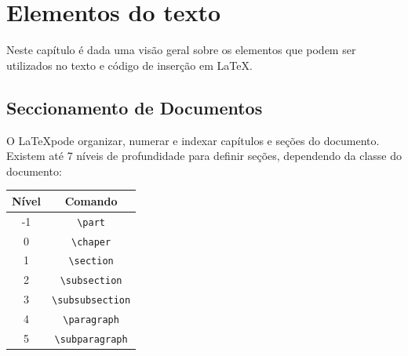 \chapter{Elementos do texto}
\label{cap:texto}

Neste capítulo é dada uma visão geral sobre os elementos que podem ser utilizados no texto e código de inserção em \LaTeX.

\section{Seccionamento de Documentos}
\label{sec:sec} 

O \LaTeX pode organizar, numerar e indexar capítulos e seções do documento. Existem até 7 níveis de profundidade para definir seções, dependendo da classe do documento:

\begin{quadro}[!ht]
\caption{Níveis de seccionamento de documentos em \LaTeX.}
\label{qua:niveis}
\begin{center}
\begin{tabular}{|c|c|}        
\hline
\textbf{Nível} & \textbf{Comando}\\ \hline\hline
-1 & \verb|\part| \\
\hline
0 & \verb|\chaper| \\
\hline
1 & \verb|\section| \\
\hline
2 & \verb|\subsection| \\
\hline
3 & \verb|\subsubsection| \\
\hline
4 & \verb|\paragraph| \\
\hline
5 & \verb|\subparagraph| \\
\hline
\end{tabular}
\end{center}
\end{quadro}

